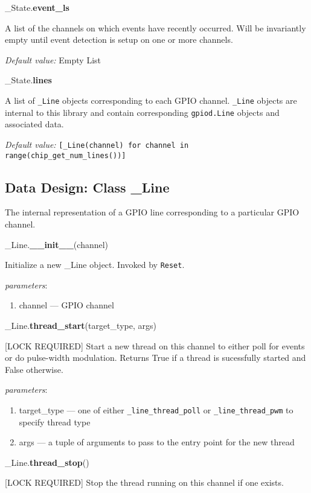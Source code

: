\documentclass[12pt]{article}
\begin{document}
\noindent \_State.\textbf{event\_ls}

A list of the channels on which events have recently occurred. Will be invariantly empty until event detection is setup on one or more channels.

\textit{Default value:} Empty List

\noindent \_State.\textbf{lines}

A list of \texttt{\_Line} objects corresponding to each GPIO channel. \texttt{\_Line} objects are internal to this library and contain corresponding \texttt{gpiod.Line} objects and associated data.

\textit{Default value:} \texttt{[\_Line(channel) for channel in range(chip\_get\_num\_lines())]}

\subsection{Data Design: Class \_Line}

The internal representation of a GPIO line corresponding to a particular GPIO channel.

\medskip

\noindent \_Line.\textbf{\_\_init\_\_}(channel)
        
Initialize a new \_Line object. Invoked by \texttt{Reset}.

\textit{parameters}:
\begin{enumerate}
        \item channel --- GPIO channel
\end{enumerate}
 
\noindent \_Line.\textbf{thread\_start}(target\_type, args)

[LOCK REQUIRED] Start a new thread on this channel to either poll for events or do pulse-width modulation.
Returns True if a thread is sucessfully started and False otherwise.

\textit{parameters}:
\begin{enumerate}
	\item target\_type --- one of either \texttt{\_line\_thread\_poll} or \texttt{\_line\_thread\_pwm} to specify thread type
	\item args --- a tuple of arguments to pass to the entry point for the new thread
\end{enumerate}

\noindent \_Line.\textbf{thread\_stop}()

[LOCK REQUIRED] Stop the thread running on this channel if one exists.
\end{document}
